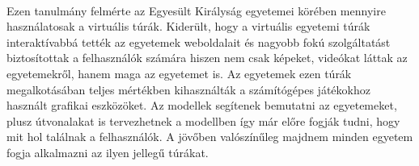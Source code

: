 \paragraph{}
Ezen tanulmány felmérte az Egyesült Királyság egyetemei körében mennyire használatosak a virtuális túrák. Kiderült, hogy a virtuális egyetemi túrák interaktívabbá tették az egyetemek weboldalait és nagyobb fokú szolgáltatást biztosítottak a felhasználók számára hiszen nem csak képeket, videókat láttak az egyetemekről, hanem maga az egyetemet is. Az egyetemek ezen túrák megalkotásában teljes mértékben kihasználták  a számítógépes játékokhoz használt grafikai eszközöket. Az modellek segítenek bemutatni az egyetemeket, plusz útvonalakat is tervezhetnek a modellben így már előre fogják tudni, hogy mit hol találnak a felhasználók. A jövőben valószínűleg majdnem minden egyetem fogja alkalmazni az ilyen jellegű túrákat.\cite{maines2015application}
